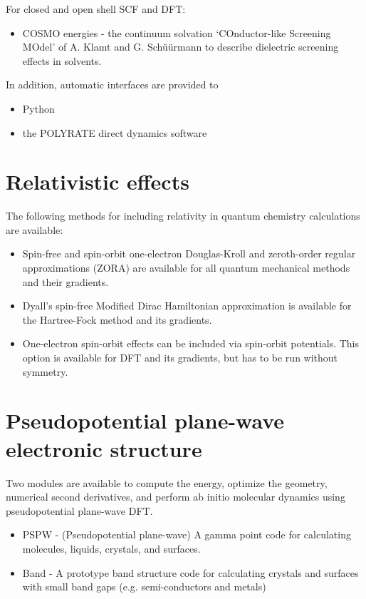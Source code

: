 For closed and open shell SCF and DFT:
\begin{itemize}
\item COSMO energies - the continuum solvation `COnductor-like Screening MOdel'
    of A. Klamt and G. Sch\"{u}\"{u}rmann to describe dielectric screening effects in
    solvents.
\end{itemize}

In addition, automatic interfaces are provided to
\begin{itemize}
\item Python
\item the POLYRATE direct dynamics software
\end{itemize}

\section{Relativistic effects}

The following methods for including relativity in quantum chemistry 
calculations are available:
\begin{itemize}
\item Spin-free and spin-orbit one-electron Douglas-Kroll and zeroth-order
regular approximations (ZORA) are available for all quantum mechanical 
methods and their gradients.
\item Dyall's spin-free Modified Dirac Hamiltonian approximation is available 
 for the Hartree-Fock method and its gradients.
\item One-electron spin-orbit effects can be included via spin-orbit potentials.
 This option is available for DFT and its gradients, but has to be run without 
 symmetry.
\end{itemize}

\section{Pseudopotential plane-wave electronic structure}

Two modules are available to compute the energy, optimize the
geometry, numerical second derivatives, and perform ab initio 
molecular dynamics using pseudopotential plane-wave DFT.

\begin{itemize}
\item PSPW - (Pseudopotential plane-wave) A gamma point code for calculating
molecules, liquids, crystals, and surfaces.
\item Band - A prototype band structure code for calculating crystals and 
surfaces with small band gaps (e.g. semi-conductors and metals)
\end{itemize}

